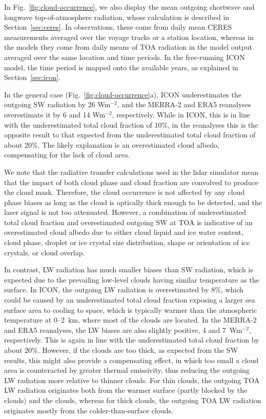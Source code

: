 \documentclass[draft]{agujournal2019}
\begin{document}
In Fig.~\ref{fig:cloud-occurrence}, we also display the mean outgoing shortwave and longwave top-of-atmosphere radiation, whose calculation is described in Section~\ref{sec:ceres}. In observations, these come from daily mean CERES measurements averaged over the voyage tracks or a station location, whereas in the models they come from daily means of TOA radiation in the model output averaged over the same location and time periods. In the free-running ICON model, the time period is mapped onto the available years, as explained in Section~\ref{sec:icon}.

In the general case (Fig.~\ref{fig:cloud-occurrence}a), ICON underestimates the outgoing SW radiation by 26 Wm$^{-2}$, and the MERRA-2 and ERA5 reanalyses overestimate it by 6 and 14 Wm$^{-2}$, respectively. While in ICON, this is in line with the underestimated total cloud fraction of 10\%, in the reanalyses this is the opposite result to that expected from the underestimated total cloud fraction of about 20\%. The likely explanation is an overestimated cloud albedo, compensating for the lack of cloud area.

We note that the radiative transfer calculations used in the lidar simulator mean that the impact of both cloud phase and cloud fraction are convolved to produce the cloud mask. Therefore, the cloud occurrence is not affected by any cloud phase biases as long as the cloud is optically thick enough to be detected, and the laser signal is not too attenuated. However, a combination of underestimated total cloud fraction and overestimated outgoing SW at TOA is indicative of an overestimated cloud albedo due to either cloud liquid and ice water content, cloud phase, droplet or ice crystal size distribution, shape or orientation of ice crystals, or cloud overlap.

In contrast, LW radiation has much smaller biases than SW radiation, which is expected due to the prevailing low-level clouds having similar temperature as the surface. In ICON, the outgoing LW radiation is overestimated by 8\%, which could be caused by an underestimated total cloud fraction exposing a larger sea surface area to cooling to space, which is typically warmer than the atmospheric temperature at 0--2~km, where most of the clouds are located. In the MERRA-2 and ERA5 reanalyses, the LW biases are also slightly positive, 4 and 7~Wm$^{-2}$, respectively. This is again in line with the underestimated total cloud fraction by about 20\%. However, if the clouds are too thick, as expected from the SW results, this might also provide a compensating effect, in which too small a cloud area is counteracted by greater thermal emissivity, thus reducing the outgoing LW radiation more relative to thinner clouds. For thin clouds, the outgoing TOA LW radiation originates both from the warmer surface (partly blocked by the clouds) and the clouds, whereas for thick clouds, the outgoing TOA LW radiation originates mostly from the colder-than-surface clouds.
\end{document}
